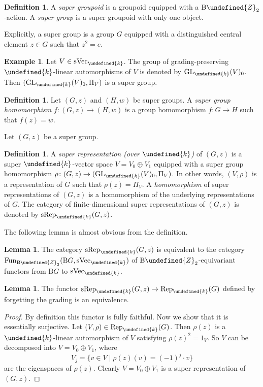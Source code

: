 \documentclass[10pt]{article}
\let\mathbb\undefined
\theoremstyle{definition}
\newtheorem{lem}[thm]{Lemma}
\newtheorem{defn}[thm]{Definition}
\newtheorem{expl}[thm]{Example}
\numberwithin{equation}{section}
\numberwithin{thm}{section}
\newcommand{\pf}{\begin{proof}}
\newcommand{\epf}{\end{proof}}
\newcommand{\Zb}{\mathbb{Z}}
\newcommand{\bk}{\mathbb{k}}
\newcommand{\rmB}{\mathrm{B}}
\DeclareMathOperator{\fun}{Fun}
\newcommand{\svect}{\mathrm{sVec}}
\newcommand{\rep}{\mathrm{Rep}}
\newcommand{\srep}{\mathrm{sRep}}
\begin{document}
\begin{defn}
A \emph{super groupoid} is a groupoid equipped with a $\rmB \Zb_2$-action. A \emph{super group} is a super groupoid with only one object.
\end{defn}

Explicitly, a super group is a group $G$ equipped with a distinguished central element $z \in G$ such that $z^2 = e$.

\begin{expl}
Let $V \in \svect_\bk$. The group of grading-preserving $\bk$-linear automorphisms of $V$ is denoted by $\mathrm{GL}_\bk(V)_0$. Then $(\mathrm{GL}_\bk(V)_0,\Pi_V)$ is a super group.
\end{expl}

\begin{defn}
Let $(G,z)$ and $(H,w)$ be super groups. A \emph{super group homomorphism} $f \colon (G,z) \to (H,w)$ is a group homomorphism $f \colon G \to H$ such that $f(z) = w$.
\end{defn}

Let $(G,z)$ be a super group.

\begin{defn}
A \emph{super representation (over $\bk$)} of $(G,z)$ is a super $\bk$-vector space $V = V_0 \oplus V_1$ equipped with a super group homomorphism $\rho \colon (G,z) \to (\mathrm{GL}_\bk(V)_0,\Pi_V)$. In other words, $(V,\rho)$ is a representation of $G$ such that $\rho(z) = \Pi_V$. A \emph{homomorphism} of super representations of $(G,z)$ is a homomorphism of the underlying representations of $G$.
The category of finite-dimensional super representations of $(G,z)$ is denoted by $\srep_\bk(G,z)$.
\end{defn}

The following lemma is almost obvious from the definition.

\begin{lem}
The category $\srep_\bk(G,z)$ is equivalent to the category $\fun_{\rmB \Zb_2}(\rmB G,\svect_\bk)$ of $\rmB \Zb_2$-equivariant functors from $\rmB G$ to $\svect_\bk$.
\end{lem}

\begin{lem}
The functor $\srep_\bk(G,z) \to \rep_\bk(G)$ defined by forgetting the grading is an equivalence.
\end{lem}

\pf
By definition this functor is fully faithful. Now we show that it is essentially surjective. Let $(V,\rho) \in \rep_\bk(G)$. Then $\rho(z)$ is a $\bk$-linear automorphism of $V$ satisfying $\rho(z)^2 = 1_V$. So $V$ can be decomposed into $V = V_0 \oplus V_1$, where
\[
V_j = \{v \in V \mid \rho(z)(v) = (-1)^j \cdot v\}
\]
are the eigenspaces of $\rho(z)$. Clearly $V = V_0 \oplus V_1$ is a super representation of $(G,z)$.
\epf
\end{document}
